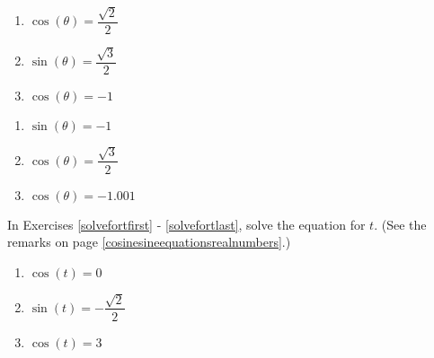 \documentclass{ximera}
\begin{document}
\begin{multicols}{3}

\begin{enumerate}

\setcounter{enumi}{\value{HW}}

\item $\cos(\theta) = \dfrac{\sqrt{2}}{2}$
\item $\sin(\theta) = \dfrac{\sqrt{3}}{2}$
\item $\cos(\theta) = -1$ 

\setcounter{HW}{\value{enumi}}

\end{enumerate}

\end{multicols}

\begin{multicols}{3}

\begin{enumerate}

\setcounter{enumi}{\value{HW}}

\item  $\sin(\theta) = -1$ 
\item  $\cos(\theta) = \dfrac{\sqrt{3}}{2}$
\item  $\cos(\theta) = -1.001$  \label{solveforanglelast}

\setcounter{HW}{\value{enumi}}

\end{enumerate}

\end{multicols}

In Exercises \ref{solvefortfirst} - \ref{solvefortlast}, solve the equation for $t$.  (See the remarks on page \ref{cosinesineequationsrealnumbers}.)

\begin{multicols}{3}

\begin{enumerate}

\setcounter{enumi}{\value{HW}}

\item $\cos(t) = 0$  \label{solvefortfirst}
\item $\sin(t) = -\dfrac{\sqrt{2}}{2}$
\item $\cos(t) = 3$ 

\setcounter{HW}{\value{enumi}}

\end{enumerate}

\end{multicols}
\end{document}
